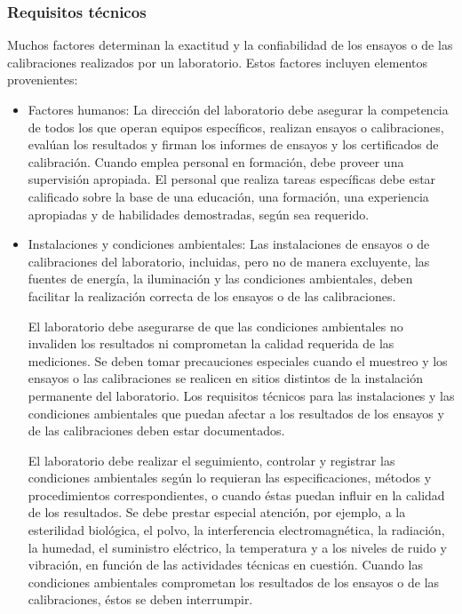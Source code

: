 \subsubsection{Requisitos técnicos}
Muchos factores determinan la exactitud y la confiabilidad de los ensayos o de las calibraciones
realizados por un laboratorio.\cite{iso17025} Estos factores incluyen elementos provenientes:

\begin{itemize}
	\item Factores humanos: La dirección del laboratorio debe asegurar la competencia de todos los que operan equipos
	específicos, realizan ensayos o calibraciones, evalúan los resultados y firman los informes de ensayos y los
	certificados de calibración. Cuando emplea personal en formación, debe proveer una supervisión apropiada.
	El personal que realiza tareas específicas debe estar calificado sobre la base de una educación, una
	formación, una experiencia apropiadas y de habilidades demostradas, según sea requerido.
	
	\item Instalaciones y condiciones ambientales: Las instalaciones de ensayos o de calibraciones del laboratorio, incluidas, pero no de manera
	excluyente, las fuentes de energía, la iluminación y las condiciones ambientales, deben facilitar la realización
	correcta de los ensayos o de las calibraciones.
	
	\par \noindent
	El laboratorio debe asegurarse de que las condiciones ambientales no invaliden los resultados ni
	comprometan la calidad requerida de las mediciones. Se deben tomar precauciones especiales cuando el
	muestreo y los ensayos o las calibraciones se realicen en sitios distintos de la instalación permanente del
	laboratorio. Los requisitos técnicos para las instalaciones y las condiciones ambientales que puedan afectar a
	los resultados de los ensayos y de las calibraciones deben estar documentados.
	
	\par \noindent
	El laboratorio debe realizar el seguimiento, controlar y registrar las condiciones ambientales según lo
	requieran las especificaciones, métodos y procedimientos correspondientes, o cuando éstas puedan influir en
	la calidad de los resultados. Se debe prestar especial atención, por ejemplo, a la esterilidad biológica, el polvo,
	la interferencia electromagnética, la radiación, la humedad, el suministro eléctrico, la temperatura y a los
	niveles de ruido y vibración, en función de las actividades técnicas en cuestión. Cuando las condiciones
	ambientales comprometan los resultados de los ensayos o de las calibraciones, éstos se deben interrumpir.
	

\end{itemize}
